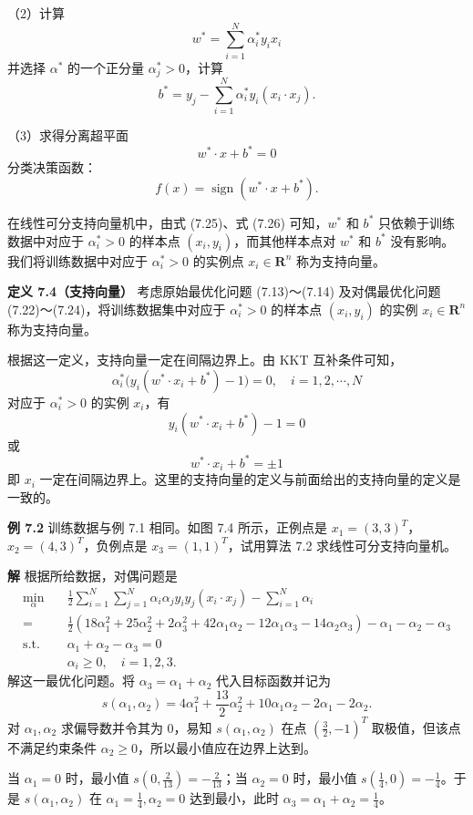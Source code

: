 \documentclass[UTF8,12pt,a4paper,fontset=fandol]{ctexart}
\begin{document}
（2）计算
\[
w^*=\sum_{i=1}^N\alpha_i^* y_i x_i
\]
并选择 $\alpha^*$ 的一个正分量 $\alpha_j^*>0$，计算
\[
b^*=y_j-\sum_{i=1}^N\alpha_i^*y_i(x_i\cdot x_j).
\]

（3）求得分离超平面
\[
w^*\cdot x+b^*=0
\]
分类决策函数：
\[
f(x)=\operatorname{sign}(w^*\cdot x+b^*).
\]

在线性可分支持向量机中，由式 (7.25)、式 (7.26) 可知，$w^*$ 和 $b^*$ 只依赖于训练数据中对应于 $\alpha_i^*>0$ 的样本点 $(x_i,y_i)$，而其他样本点对 $w^*$ 和 $b^*$ 没有影响。我们将训练数据中对应于 $\alpha_i^*>0$ 的实例点 $x_i\in\mathbf{R}^n$ 称为支持向量。

\noindent\textbf{定义 7.4（支持向量）}\quad
考虑原始最优化问题 (7.13)～(7.14) 及对偶最优化问题 (7.22)～(7.24)，将训练数据集中对应于 $\alpha_i^*>0$ 的样本点 $(x_i,y_i)$ 的实例 $x_i\in\mathbf{R}^n$ 称为支持向量。

根据这一定义，支持向量一定在间隔边界上。由 KKT 互补条件可知，
\[
\alpha_i^*\bigl(y_i(w^*\cdot x_i+b^*)-1\bigr)=0,\quad i=1,2,\cdots,N
\]
对应于 $\alpha_i^*>0$ 的实例 $x_i$，有
\[
y_i(w^*\cdot x_i+b^*)-1=0
\]
或
\[
w^*\cdot x_i+b^*=\pm 1
\]
即 $x_i$ 一定在间隔边界上。这里的支持向量的定义与前面给出的支持向量的定义是一致的。

\noindent\textbf{例 7.2}\quad
训练数据与例 7.1 相同。如图 7.4 所示，正例点是 $x_1=(3,3)^T$，$x_2=(4,3)^T$，负例点是 $x_3=(1,1)^T$，试用算法 7.2 求线性可分支持向量机。

\noindent\textbf{解}\quad
根据所给数据，对偶问题是
\[
\begin{aligned}
\min_\alpha\quad &
\frac{1}{2}\sum_{i=1}^N\sum_{j=1}^N\alpha_i\alpha_j y_i y_j(x_i\cdot x_j)-\sum_{i=1}^N\alpha_i\\
=&\frac{1}{2}(18\alpha_1^2+25\alpha_2^2+2\alpha_3^2+42\alpha_1\alpha_2-12\alpha_1\alpha_3-14\alpha_2\alpha_3)-\alpha_1-\alpha_2-\alpha_3\\
\mathrm{s.t.}\quad & \alpha_1+\alpha_2-\alpha_3=0\\
& \alpha_i\geq 0,\quad i=1,2,3.
\end{aligned}
\]
解这一最优化问题。将 $\alpha_3=\alpha_1+\alpha_2$ 代入目标函数并记为
\[
s(\alpha_1,\alpha_2)=4\alpha_1^2+\frac{13}{2}\alpha_2^2+10\alpha_1\alpha_2-2\alpha_1-2\alpha_2.
\]
对 $\alpha_1,\alpha_2$ 求偏导数并令其为 0，易知 $s(\alpha_1,\alpha_2)$ 在点 $\left(\frac{3}{2},-1\right)^T$ 取极值，但该点不满足约束条件 $\alpha_2\geq 0$，所以最小值应在边界上达到。

当 $\alpha_1=0$ 时，最小值 $s\left(0,\frac{2}{13}\right)=-\frac{2}{13}$；当 $\alpha_2=0$ 时，最小值 $s\left(\frac{1}{4},0\right)=-\frac{1}{4}$。于是 $s(\alpha_1,\alpha_2)$ 在 $\alpha_1=\frac{1}{4},\alpha_2=0$ 达到最小，此时 $\alpha_3=\alpha_1+\alpha_2=\frac{1}{4}$。
\end{document}
